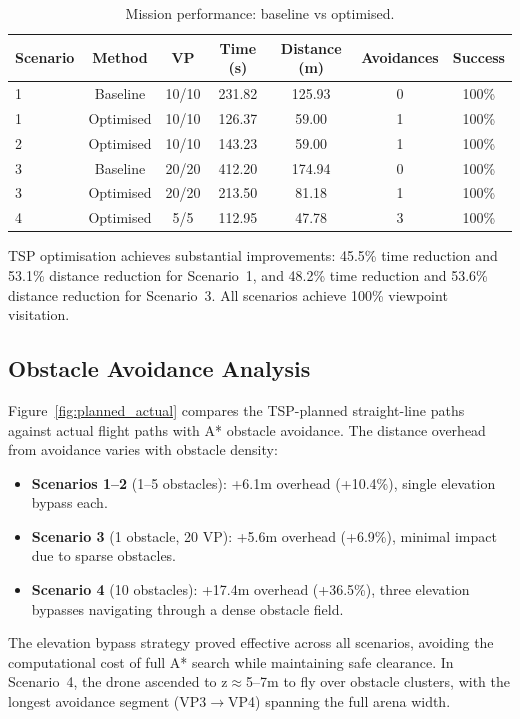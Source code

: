 \documentclass[11pt,a4paper]{article}
\begin{document}
\begin{table}[H]
\centering
\caption{Mission performance: baseline vs optimised.}
\label{tab:results}
\begin{tabular}{lcccccc}
\toprule
Scenario & Method & VP & Time (s) & Distance (m) & Avoidances & Success \\
\midrule
1 & Baseline  & 10/10 & 231.82 & 125.93 & 0 & 100\% \\
1 & Optimised & 10/10 & 126.37 & 59.00  & 1 & 100\% \\
\midrule
2 & Optimised & 10/10 & 143.23 & 59.00  & 1 & 100\% \\
\midrule
3 & Baseline  & 20/20 & 412.20 & 174.94 & 0 & 100\% \\
3 & Optimised & 20/20 & 213.50 & 81.18  & 1 & 100\% \\
\midrule
4 & Optimised & 5/5   & 112.95 & 47.78  & 3 & 100\% \\
\bottomrule
\end{tabular}
\end{table}

TSP optimisation achieves substantial improvements: 45.5\% time reduction and 53.1\% distance reduction for Scenario~1, and 48.2\% time reduction and 53.6\% distance reduction for Scenario~3. All scenarios achieve 100\% viewpoint visitation.

\subsection{Obstacle Avoidance Analysis}

Figure~\ref{fig:planned_actual} compares the TSP-planned straight-line paths against actual flight paths with A* obstacle avoidance. The distance overhead from avoidance varies with obstacle density:

\begin{itemize}
    \item \textbf{Scenarios 1--2} (1--5 obstacles): +6.1m overhead (+10.4\%), single elevation bypass each.
    \item \textbf{Scenario 3} (1 obstacle, 20 VP): +5.6m overhead (+6.9\%), minimal impact due to sparse obstacles.
    \item \textbf{Scenario 4} (10 obstacles): +17.4m overhead (+36.5\%), three elevation bypasses navigating through a dense obstacle field.
\end{itemize}

The elevation bypass strategy proved effective across all scenarios, avoiding the computational cost of full A* search while maintaining safe clearance. In Scenario~4, the drone ascended to z$\approx$5--7m to fly over obstacle clusters, with the longest avoidance segment (VP3$\to$VP4) spanning the full arena width.
\end{document}
